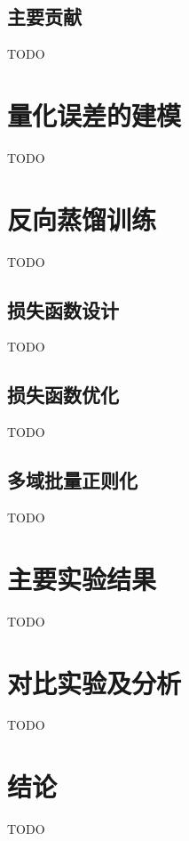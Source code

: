 \subsection{主要贡献}
TODO

\section{量化误差的建模}
TODO

\section{反向蒸馏训练}
TODO
\subsection{损失函数设计}
TODO
\subsection{损失函数优化}
TODO
\subsection{多域批量正则化}
TODO

\section{主要实验结果}
TODO

\section{对比实验及分析}
TODO

\section{结论}
TODO

